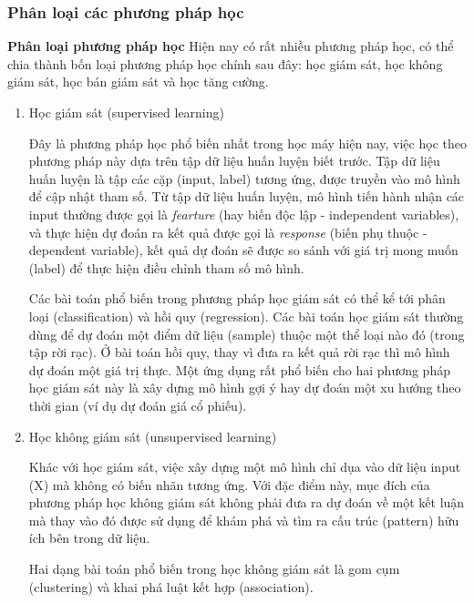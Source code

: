 
\subsubsection{Phân loại các phương pháp học}
\textbf{Phân loại phương pháp học}
Hiện nay có rất nhiều phương pháp học, có thể chia thành bốn loại phương pháp học chính sau đây: học giám sát, học không giám sát, học bán giám sát và học tăng cường.

\begin{enumerate}
    \item Học giám sát (supervised learning)

          Đây là phương pháp học phổ biến nhất trong học máy hiện nay, việc học theo phương pháp này dựa trên tập dữ liệu huấn luyện biết trước. Tập dữ liệu huấn luyện là tập các cặp (input, label) tương ứng, được truyền vào mô hình để cập nhật tham số. Từ tập dữ liệu huấn luyện, mô hình tiến hành nhận các input thường được gọi là \textit{fearture} (hay biến độc lập - independent variables), và thực hiện dự đoán ra kết quả được gọi là \textit{response} (biến phụ thuộc - dependent variable), kết quả dự đoán sẽ được so sánh với giá trị mong muốn (label) để thực hiện điều chỉnh tham số mô hình.

          Các bài toán phổ biến trong phương pháp học giám sát có thể kể tới phân loại (classification) và hồi quy (regression). Các bài toán học giám sát thường dùng để dự đoán một điểm dữ liệu (sample) thuộc một thể loại nào đó (trong tập rời rạc). Ở bài toán hồi quy, thay vì đưa ra kết quả rời rạc thì mô hình dự đoán một giá trị thực. Một ứng dụng rất phổ biến cho hai phương pháp học giám sát này là xây dựng mô hình gợi ý hay dự đoán một xu hướng theo thời gian (ví dụ dự đoán giá cổ phiếu).

    \item Học không giám sát (unsupervised learning)

          Khác với học giám sát, việc xây dựng một mô hình chỉ dụa vào dữ liệu input (X) mà không có biến nhãn tương ứng. Với đặc điểm này, mục đích của phương pháp học không giám sát không phải đưa ra dự đoán về một kết luận mà thay vào đó được sử dụng để khám phá và tìm ra cấu trúc (pattern) hữu ích bên trong dữ liệu.

          Hai dạng bài toán phổ biến trong học không giám sát là gom cụm (clustering) và khai phá luật kết hợp (association).


\end{enumerate}
